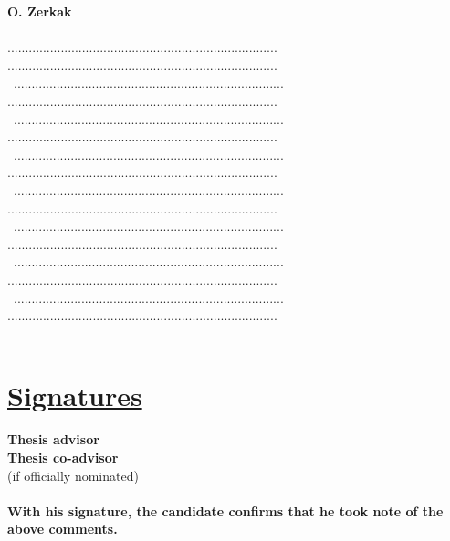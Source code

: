 \documentclass[11pt,titlepage]{article}
\begin{document}
\noindent\textbf{O. Zerkak}\\\\
............................................................................
............................................................................\\\
............................................................................
............................................................................\\\
............................................................................
............................................................................\\\
............................................................................
............................................................................\\\
............................................................................
............................................................................\\\
............................................................................
............................................................................\\\
............................................................................
............................................................................\\\
............................................................................
............................................................................\\\

\section*{\underline{Signatures}\\}
\noindent \textbf{Thesis advisor}\hspace{6.25cm}\dotfill\vspace{0.5cm}\\

\noindent \textbf{Thesis co-advisor}\hspace{5.7cm}\dotfill\\
\noindent  (if officially nominated)\\\\

\noindent \textbf{With his signature, the candidate confirms that he took note 
                  of the above comments.}\\\\
\end{document}
